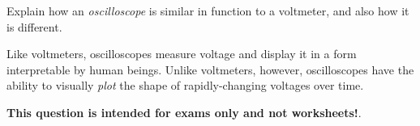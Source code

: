 

Explain how an {\it oscilloscope} is similar in function to a voltmeter, and also how it is different.







Like voltmeters, oscilloscopes measure voltage and display it in a form interpretable by human beings.  Unlike voltmeters, however, oscilloscopes have the ability to visually {\it plot} the shape of rapidly-changing voltages over time.







{\bf This question is intended for exams only and not worksheets!}.




